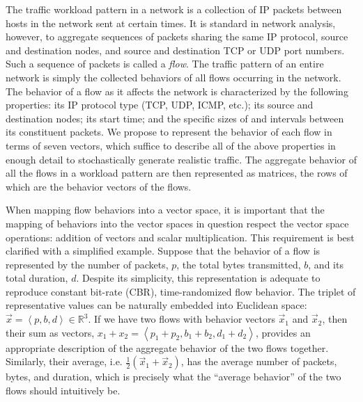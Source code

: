 \documentclass[twocolumn,final]{svjour3}
\newcommand{\caps}[1]{{\small{#1}}}
\newcommand{\R}{\mathbb{R}}
\newcommand{\seq}[1]{\left<#1\right>}
\begin{document}
The traffic workload pattern in a network is a collection of \caps{IP} packets between hosts in the network sent at certain times. It is standard in network analysis, however, to aggregate sequences of packets sharing the same \caps{IP} protocol, source and destination nodes, and source and destination \caps{TCP} or \caps{UDP} port numbers. Such a sequence of packets is called a \textit{flow}. The traffic pattern of an entire network is simply the collected behaviors of all flows occurring in the network. The behavior of a flow as it affects the network is characterized by the following properties: its \caps{IP} protocol type (\caps{TCP}, \caps{UDP}, \caps{ICMP}, etc.); its source and destination nodes; its start time; and the specific sizes of and intervals between its constituent packets. We propose to represent the behavior of each flow in terms of seven vectors, which suffice to describe all of the above properties in enough detail to stochastically generate realistic traffic. The aggregate behavior of all the flows in a workload pattern are then represented as matrices, the rows of which are the behavior vectors of the flows.

When mapping flow behaviors into a vector space, it is important that the mapping of behaviors into the vector spaces in question respect the vector space operations: addition of vectors and scalar multiplication. This requirement is best clarified with a simplified example. Suppose that the behavior of a flow is represented by the number of packets, $p$, the total bytes transmitted, $b$, and its total duration, $d$. Despite its simplicity, this representation is adequate to reproduce constant bit-rate (\caps{CBR}), time-randomized flow behavior. The triplet of representative values can be naturally embedded into Euclidean space: $\vec{x}=\seq{p,b,d}\in\R^3$. If we have two flows with behavior vectors $\vec{x}_1$ and $\vec{x}_2$, then their sum as vectors, $x_1+x_2=\seq{p_1+p_2,b_1+b_2,d_1+d_2}$, provides an appropriate description of the aggregate behavior of the two flows together. Similarly, their average, i.e. $\frac{1}{2}(\vec{x}_1+\vec{x}_2)$, has the average number of packets, bytes, and duration, which is precisely what the ``average behavior'' of the two flows should intuitively be.

\end{document}
